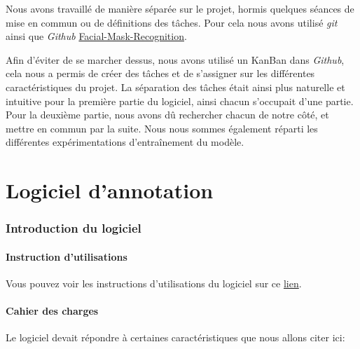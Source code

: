 \documentclass{rapport}
\begin{document}
        Nous avons travaillé de manière séparée sur le projet, hormis quelques séances de mise en commun ou de définitions des tâches. Pour cela nous avons utilisé \textit{git} ainsi que \textit{Github} \href{https://github.com/Brotherta/Facial-Mask-Recognition}{Facial-Mask-Recognition}.

        Afin d'éviter de se marcher dessus, nous avons utilisé un KanBan dans \textit{Github}, cela nous a permis de créer des tâches et de s'assigner sur les différentes caractéristiques du projet. La séparation des tâches était ainsi plus naturelle et intuitive pour la première partie du logiciel, ainsi chacun s'occupait d'une partie. Pour la deuxième partie, nous avons dû rechercher chacun de notre côté, et mettre en commun par la suite. Nous nous sommes également réparti les différentes expérimentations d'entraînement du modèle.
    \clearpage
    
\part{Logiciel d'annotation}

    \section{Introduction du logiciel}
        
        \subsection{Instruction d'utilisations}
        
        Vous pouvez voir les instructions d'utilisations du logiciel sur ce \href{https://github.com/Brotherta/Facial-Mask-Recognition/blob/main/README.md}{lien}.
        
        \subsection{Cahier des charges}
        
            Le logiciel devait répondre à certaines caractéristiques que nous allons citer ici:
\end{document}
